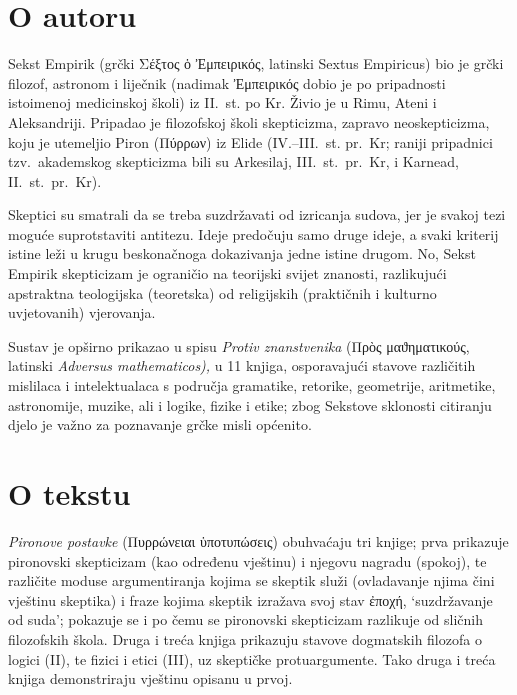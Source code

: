 \section*{O autoru}

Sekst Empirik (grčki Σέξτος ὁ Ἐμπειρικός, latinski Sextus Empiricus) bio je grčki filozof, astronom i liječnik (nadimak Ἐμπειρικός dobio je po pripadnosti istoimenoj medicinskoj školi) iz II.~st. po Kr. Živio je u Rimu, Ateni i Aleksandriji. Pripadao je filozofskoj školi skepticizma, zapravo neoskepticizma, koju je utemeljio Piron \textgreek[variant=ancient]{(Πύρρων)} iz Elide (IV.–III.~st. pr.~Kr; raniji pripadnici tzv.\ akademskog skepticizma bili su Arkesilaj, III.~st.\ pr.~Kr, i Karnead, II.~st.\ pr.~Kr). 

Skeptici su smatrali da se treba suzdržavati od izricanja sudova, jer je svakoj tezi moguće suprotstaviti antitezu. Ideje predočuju samo druge ideje, a svaki kriterij istine leži u krugu beskonačnoga dokazivanja jedne istine drugom. No, Sekst Empirik skepticizam je ograničio na teorijski svijet znanosti, razlikujući apstraktna teologijska (teoretska) od religijskih (praktičnih i kulturno uvjetovanih) vjerovanja. 

Sustav je opširno prikazao u spisu \textit{Protiv znanstvenika} \textgreek[variant=ancient]{(Πρὸς μαϑηματικούς,} latinski \textit{Adversus mathematicos),} u 11 knjiga, osporavajući stavove različitih mislilaca i intelektualaca s područja gramatike, retorike, geometrije, aritmetike, astronomije, muzike, ali i logike, fizike i etike; zbog Sekstove sklonosti citiranju djelo je važno za poznavanje grčke misli općenito.

\section*{O tekstu}

\textit{Pironove postavke} \textgreek[variant=ancient]{(Πυρρώνειαι ὑποτυπώσεις)} obuhvaćaju tri knjige; prva prikazuje pironovski skepticizam (kao određenu vještinu) i njegovu nagradu (spokoj), te različite moduse argumentiranja kojima se skeptik služi (ovladavanje njima čini vještinu skeptika) i fraze kojima skeptik izražava svoj stav ἐποχή, `suzdržavanje od suda'; pokazuje se i po čemu se pironovski skepticizam razlikuje od sličnih filozofskih škola. Druga i treća knjiga prikazuju stavove dogmatskih filozofa o logici (II), te fizici i etici (III), uz skeptičke protuargumente. Tako druga i treća knjiga demonstriraju vještinu opisanu u prvoj.

